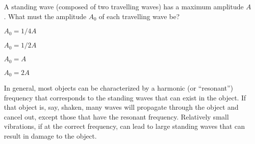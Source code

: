 \begin{checkpoint}
\begin{MCquestion}{A standing wave (composed of two travelling waves) has a maximum amplitude $A$. What must the amplitude $A_0$ of each travelling wave be? }
\item $A_0=1/4 A$
\item $A_0=1/2 A$ \correct
\item $A_0=A$
\item $A_0=2A$
\end{MCquestion}
\end{checkpoint}

In general, most objects can be characterized by a harmonic (or ``resonant'') frequency that corresponds to the standing waves that can exist in the object. If that object is, say, shaken, many waves will propagate through the object and cancel out, except those that have the resonant frequency. Relatively small vibrations, if at the correct frequency, can lead to large standing waves that can result in damage to the object. 

